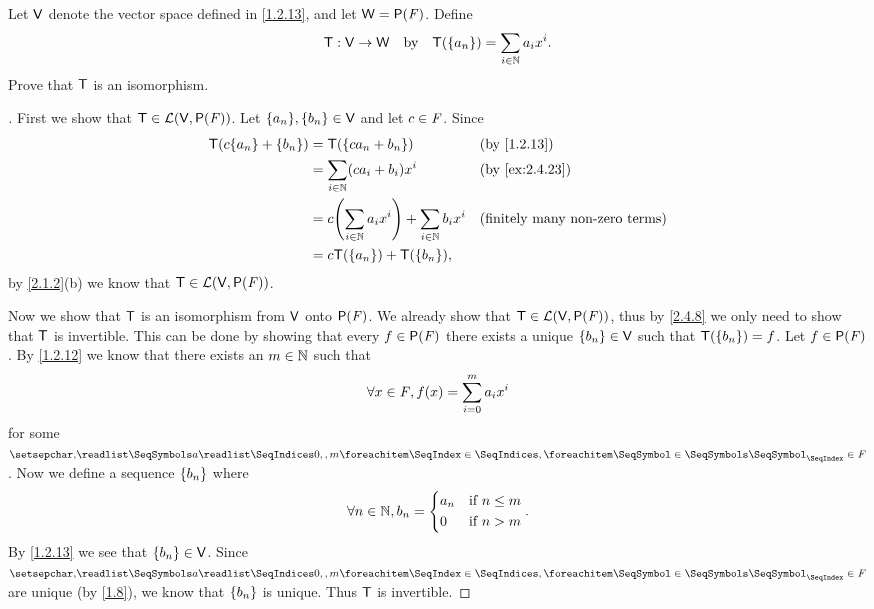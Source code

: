 \begin{ex}\label{ex:2.4.23}
	Let \(\mathsf{V}\) denote the vector space defined in \cref{1.2.13}, and let \(\W = \ps{\F}\).
	Define
	\[
		\mathsf{T} : \mathsf{V} \to \mathsf{W} \quad \text{by} \quad \mathsf{T}(\left\lbrace a_n\right\rbrace) = \sum_{i \in \mathbb{N}} a_i x^i.
	\]
	Prove that \(\mathsf{T}\) is an isomorphism.
\end{ex}

\begin{proof}[]
	First we show that \(\T \in \ls(\V, \ps{\F})\).
	Let \(\set{a_n}, \set{b_n} \in \V\) and let \(c \in \mathit{F}\).
	Since
	\begin{align*}
		\T(c \set{a_n} + \set{b_n}) & = \T(\set{c a_n + b_n})                                    &  & \by{1.2.13}                           \\
		                            & = \sum_{i \in \N} (c a_i + b_i) x^i                        &  & \by{ex:2.4.23}                        \\
		                            & = c \pa{\sum_{i \in \N} a_i x^i} + \sum_{i \in \N} b_i x^i &  & \text{(finitely many non-zero terms)} \\
		                            & = c \T(\set{a_n}) + \T(\set{b_n}),
	\end{align*}
	by \cref{2.1.2}(b) we know that \(\T \in \ls(\V, \ps{\F})\).

	Now we show that \(\mathsf{T}\) is an isomorphism from \(\mathsf{V}\) onto \(\ps{\F}\).
	We already show that \(\T \in \ls(\V, \ps{\F})\), thus by \cref{2.4.8} we only need to show that \(\mathsf{T}\) is invertible.
	This can be done by showing that every \(f \in \ps{\F}\) there exists a unique \(\left\lbrace b_n\right\rbrace \in \mathsf{V}\) such that \(\mathsf{T}(\left\lbrace b_n\right\rbrace) = f\).
	Let \(f \in \ps{\F}\).
	By \cref{1.2.12} we know that there exists an \(m \in \mathbb{N}\) such that
	\[
		\forall x \in \mathit{F}, f(x) = \sum_{i = 0}^m a_i x^i
	\]
	for some \(\seq{a}{0,,m} \in \F\).
	Now we define a sequence \(\left\lbrace b_n\right\rbrace\) where
	\[
		\forall n \in \mathbb{N}, b_n = \begin{dcases}
			a_n & \text{if } n \leq m \\
			0   & \text{if } n > m
		\end{dcases}.
	\]
	By \cref{1.2.13} we see that \(\left\lbrace b_n\right\rbrace \in \mathsf{V}\).
	Since \(\seq{a}{0,,m} \in \F\) are unique (by \cref{1.8}), we know that \(\left\lbrace b_n\right\rbrace\) is unique.
	Thus \(\mathsf{T}\) is invertible.
\end{proof}

